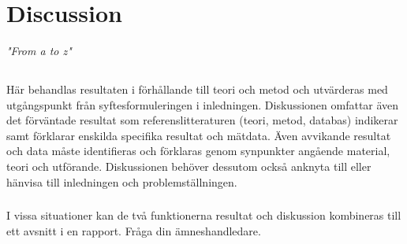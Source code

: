 \chapter{Discussion}
\begin{center}
\vspace{-6ex}
\textit{"From a to z"}
\vspace{6ex}
\end{center}



\section{}
Här behandlas resultaten i förhållande till teori och metod och
utvärderas med utgångspunkt från syftesformuleringen i
inledningen. Diskussionen omfattar även det förväntade resultat
som referenslitteraturen (teori, metod, databas) indikerar samt 
förklarar enskilda specifika resultat och mätdata. Även
avvikande resultat och data måste identifieras och förklaras
genom synpunkter angående material, teori och utförande.
Diskussionen behöver dessutom också anknyta till eller hänvisa
till inledningen och problemställningen. 

\subsection{}

I vissa situationer kan de två funktionerna resultat och
diskussion kombineras till ett avsnitt i en rapport. Fråga din
ämneshandledare. 
